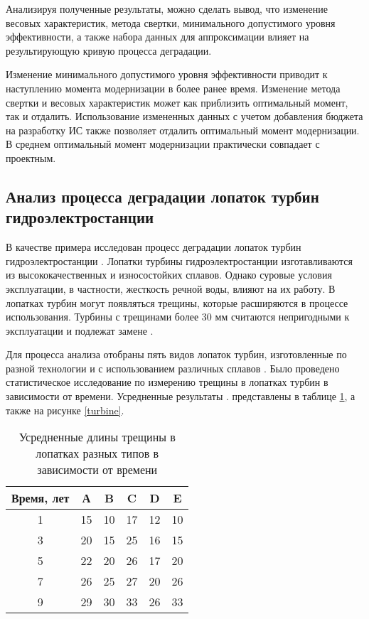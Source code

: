Анализируя полученные результаты, можно сделать вывод, что изменение весовых характеристик,
метода свертки, минимального допустимого уровня эффективности, а также набора данных для аппроксимации
влияет на результирующую кривую процесса деградации.

Изменение минимального допустимого уровня эффективности приводит к наступлению момента модернизации в более ранее время.
Изменение метода свертки и весовых характеристик может как приблизить оптимальный момент, так и отдалить.
Использование измененных данных с учетом добавления бюджета на разработку ИС также позволяет отдалить оптимальный момент модернизации.
В среднем оптимальный момент модернизации практически совпадает с проектным.

\subsection{Анализ процесса деградации лопаток турбин гидроэлектростанции}
В качестве примера исследован процесс деградации лопаток турбин гидроэлектростанции \cite{Degradation}.
Лопатки турбины гидроэлектростанции изготавливаются из высококачественных и износостойких сплавов.
Однако суровые условия эксплуатации, в частности, жесткость речной воды, влияют на их работу.
В лопатках турбин могут появляться трещины, которые расширяются в процессе использования.
Турбины с трещинами более 30 мм считаются непригодными к эксплуатации и подлежат замене \cite{Degradation}.

Для процесса анализа отобраны пять видов лопаток турбин, изготовленные по разной технологии и с использованием различных сплавов \cite{Degradation}.
Было проведено статистическое исследование по измерению трещины в лопатках турбин в зависимости от времени.
Усредненные результаты \cite{Degradation}. представлены в таблице \ref{table:turbine}, а также на рисунке \ref{turbine}.

\begin{table}[H]
    \centering
    \caption{Усредненные длины трещины в лопатках разных типов в зависимости от времени}\label{table:turbine}
    \begin{tabular}{|c|c|c|c|c|c|}
    \hline Время, лет & А & B & C & D & E \\
    \hline 1 & 15 & 10 & 17 & 12 & 10 \\
    \hline 3 & 20 & 15 & 25 &  16 & 15 \\
    \hline 5 & 22 & 20 & 26 & 17 & 20 \\
    \hline 7 & 26 & 25 & 27 & 20 & 26 \\
    \hline 9 & 29 & 30 & 33 & 26 & 33 \\
    \hline
    \end{tabular}
\end{table}

